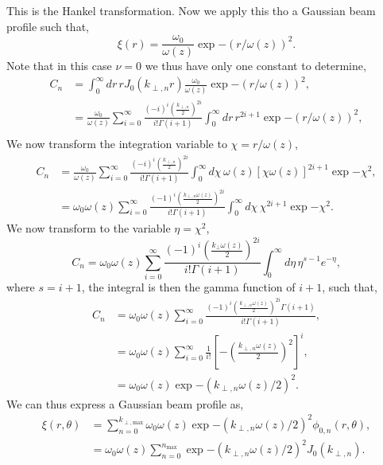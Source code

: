 \documentclass{article}
\begin{document}
This is the Hankel transformation. Now we apply this tho a Gaussian beam profile such that,
\begin{equation*}
  \xi(r)=\frac{\omega_0}{\omega(z)}\exp{-\left(r/\omega(z)\right)^2}.
\end{equation*}
Note that in this case $\nu=0$ we thus have only one constant to determine,
\begin{align*}
  C_{n}&=\int_0^{\infty}dr\,rJ_0(k_{\perp,n}r)\frac{\omega_0}{\omega(z)}\exp{-\left(r/\omega(z)\right)^2},\\
  &=\frac{\omega_0}{\omega(z)}\sum_{i=0}^{\infty}\frac{(-i)^i\left(\frac{k_{\perp,n}}{2}\right)^{2i}}{i!\Gamma(i+1)}\int_0^{\infty}dr\,r^{2i+1}\exp{-\left(r/\omega(z)\right)^2},\\
\end{align*}
We now transform the integration variable to $\chi=r/\omega(z)$,
\begin{align*}
  C_{n}&=\frac{\omega_0}{\omega(z)}\sum_{i=0}^{\infty}\frac{(-i)^i\left(\frac{k_{\perp,n}}{2}\right)^{2i}}{i!\Gamma(i+1)}\int_0^{\infty}d\chi\,\omega(z)\left[\chi\omega(z)\right]^{2i+1}\exp{-\chi^2},\\
  &=\omega_0\omega(z)\sum_{i=0}^{\infty}\frac{(-1)^i\left(\frac{k_{\perp,n}\omega(z)}{2}\right)^{2i}}{i!\Gamma(i+1)}\int_0^{\infty}d\chi\,\chi^{2i+1}\exp{-\chi^2}.
\end{align*}
We now transform to the variable $\eta=\chi^2$,
\begin{equation*}
  C_n=\omega_0\omega(z)\sum_{i=0}^{\infty}\frac{(-1)^i\left(\frac{k_{\perp}\omega(z)}{2}\right)^{2i}}{i!\Gamma(i+1)}\int_0^{\infty}d\eta\,\eta^{s-1}e^{-\eta},
\end{equation*}
where $s=i+1$, the integral is then the gamma function of $i+1$, such that,
\begin{align*}
  C_n&=\omega_0\omega(z)\sum_{i=0}^{\infty}\frac{(-1)^i\left(\frac{k_{\perp,n}\omega(z)}{2}\right)^{2i}\Gamma(i+1)}{i!\Gamma(i+1)},\\
  &=\omega_0\omega(z)\sum_{i=0}^{\infty}\frac{1}{i!}\left[-\left(\frac{k_{\perp,n}\omega(z)}{2}\right)^2\right]^i,\\
  &=\omega_0\omega(z)\exp{-\left(k_{\perp,n}\omega(z)/2\right)^2}.
\end{align*}
We can thus express a Gaussian beam profile as,
\begin{align*}
  \xi(r,\theta)&=\sum_{n=0}^{k_{\perp,\text{max}}}\omega_0\omega(z)\exp{-\left(k_{\perp,n}\omega(z)/2\right)^2}\phi_{0,n}(r,\theta),\\
  &=\omega_0\omega(z)\sum_{n=0}^{n_{\text{max}}}\exp{-\left(k_{\perp,n}\omega(z)/2\right)^2}J_{0}(k_{\perp,n}).
\end{align*}
\end{document}

